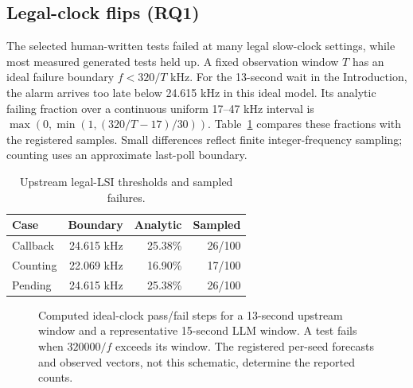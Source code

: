 \documentclass[sigconf,nonacm]{acmart}
\begin{document}
\subsection{Legal-clock flips (RQ1)}
The selected human-written tests failed at many legal slow-clock settings, while most measured generated tests held up. A fixed observation window $T$ has an ideal failure boundary $f<320/T$ kHz. For the 13-second wait in the Introduction, the alarm arrives too late below 24.615 kHz in this ideal model. Its analytic failing fraction over a continuous uniform 17--47 kHz interval is $\max(0,\min(1,(320/T-17)/30))$. Table~\ref{tab:human} compares these fractions with the registered samples. Small differences reflect finite integer-frequency sampling; counting uses an approximate last-poll boundary.

\begin{table}[t]
\caption{Upstream legal-LSI thresholds and sampled failures.}
\label{tab:human}\scriptsize
\begin{tabular}{@{}lrrr@{}}\toprule
Case & Boundary & Analytic & Sampled \\ \midrule
Callback & 24.615 kHz & 25.38\% & 26/100 \\
Counting & 22.069 kHz & 16.90\% & 17/100 \\
Pending & 24.615 kHz & 25.38\% & 26/100 \\
\bottomrule\end{tabular}
\end{table}

\begin{figure}[t]
\centering
{}
\caption{Computed ideal-clock pass/fail steps for a 13-second upstream window and a representative 15-second LLM window. A test fails when $320000/f$ exceeds its window. The registered per-seed forecasts and observed vectors, not this schematic, determine the reported counts.}
\label{fig:step}
\end{figure}
\end{document}
